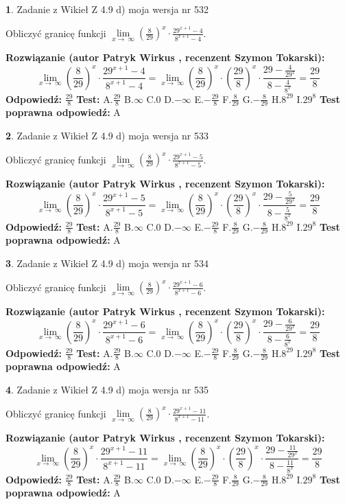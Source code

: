 \documentclass[12pt, a4paper]{article}
\theoremstyle{definition} %
\newtheorem{zad}{}
\newcommand{\zadStart}[1]{\begin{zad}#1\newline}
\newcommand{\zadStop}{\end{zad}}
\newcommand{\rozwStart}[2]{\noindent \textbf{Rozwiązanie (autor #1 , recenzent #2): }\newline}
\newcommand{\rozwStop}{\newline}
\newcommand{\odpStart}{\noindent \textbf{Odpowiedź:}\newline}
\newcommand{\odpStop}{\newline}
\newcommand{\testStart}{\noindent \textbf{Test:}\newline}
\newcommand{\testStop}{\newline}
\newcommand{\kluczStart}{\noindent \textbf{Test poprawna odpowiedź:}\newline}
\newcommand{\kluczStop}{\newline}
\begin{document}
\zadStart{Zadanie z Wikieł Z 4.9 d) moja wersja nr 532}


Obliczyć granicę funkcji  $\lim\limits_{x\to\ \infty}(\frac{8}{29})^{x}\cdot\frac{29^{x+1}-4}{8^{x+1}-4}$.
\zadStop
\rozwStart{Patryk Wirkus}{Szymon Tokarski}
$$\lim\limits_{x\to\ \infty}(\frac{8}{29})^{x}\cdot\frac{29^{x+1}-4}{8^{x+1}-4}=\lim\limits_{x\to\ \infty}(\frac{8}{29})^{x}\cdot(\frac{29}{8})^{x} \cdot \frac{29-\frac{4}{29^{x}}}{8-\frac{4}{8^{x}}} = \frac{29}{8}$$
\rozwStop
\odpStart
$\frac{29}{8}$
\odpStop
\testStart
A.$\frac{29}{8}$ B.$\infty$ C.$0$ D.$-\infty$ E.$-\frac{29}{8}$
F.$\frac{8}{29}$ G.$-\frac{8}{29}$
H.$8^{29}$
I.$29^{8}$
\testStop
\kluczStart
A
\kluczStop



\zadStart{Zadanie z Wikieł Z 4.9 d) moja wersja nr 533}


Obliczyć granicę funkcji  $\lim\limits_{x\to\ \infty}(\frac{8}{29})^{x}\cdot\frac{29^{x+1}-5}{8^{x+1}-5}$.
\zadStop
\rozwStart{Patryk Wirkus}{Szymon Tokarski}
$$\lim\limits_{x\to\ \infty}(\frac{8}{29})^{x}\cdot\frac{29^{x+1}-5}{8^{x+1}-5}=\lim\limits_{x\to\ \infty}(\frac{8}{29})^{x}\cdot(\frac{29}{8})^{x} \cdot \frac{29-\frac{5}{29^{x}}}{8-\frac{5}{8^{x}}} = \frac{29}{8}$$
\rozwStop
\odpStart
$\frac{29}{8}$
\odpStop
\testStart
A.$\frac{29}{8}$ B.$\infty$ C.$0$ D.$-\infty$ E.$-\frac{29}{8}$
F.$\frac{8}{29}$ G.$-\frac{8}{29}$
H.$8^{29}$
I.$29^{8}$
\testStop
\kluczStart
A
\kluczStop



\zadStart{Zadanie z Wikieł Z 4.9 d) moja wersja nr 534}


Obliczyć granicę funkcji  $\lim\limits_{x\to\ \infty}(\frac{8}{29})^{x}\cdot\frac{29^{x+1}-6}{8^{x+1}-6}$.
\zadStop
\rozwStart{Patryk Wirkus}{Szymon Tokarski}
$$\lim\limits_{x\to\ \infty}(\frac{8}{29})^{x}\cdot\frac{29^{x+1}-6}{8^{x+1}-6}=\lim\limits_{x\to\ \infty}(\frac{8}{29})^{x}\cdot(\frac{29}{8})^{x} \cdot \frac{29-\frac{6}{29^{x}}}{8-\frac{6}{8^{x}}} = \frac{29}{8}$$
\rozwStop
\odpStart
$\frac{29}{8}$
\odpStop
\testStart
A.$\frac{29}{8}$ B.$\infty$ C.$0$ D.$-\infty$ E.$-\frac{29}{8}$
F.$\frac{8}{29}$ G.$-\frac{8}{29}$
H.$8^{29}$
I.$29^{8}$
\testStop
\kluczStart
A
\kluczStop



\zadStart{Zadanie z Wikieł Z 4.9 d) moja wersja nr 535}


Obliczyć granicę funkcji  $\lim\limits_{x\to\ \infty}(\frac{8}{29})^{x}\cdot\frac{29^{x+1}-11}{8^{x+1}-11}$.
\zadStop
\rozwStart{Patryk Wirkus}{Szymon Tokarski}
$$\lim\limits_{x\to\ \infty}(\frac{8}{29})^{x}\cdot\frac{29^{x+1}-11}{8^{x+1}-11}=\lim\limits_{x\to\ \infty}(\frac{8}{29})^{x}\cdot(\frac{29}{8})^{x} \cdot \frac{29-\frac{11}{29^{x}}}{8-\frac{11}{8^{x}}} = \frac{29}{8}$$
\rozwStop
\odpStart
$\frac{29}{8}$
\odpStop
\testStart
A.$\frac{29}{8}$ B.$\infty$ C.$0$ D.$-\infty$ E.$-\frac{29}{8}$
F.$\frac{8}{29}$ G.$-\frac{8}{29}$
H.$8^{29}$
I.$29^{8}$
\testStop
\kluczStart
A
\kluczStop
\end{document}
